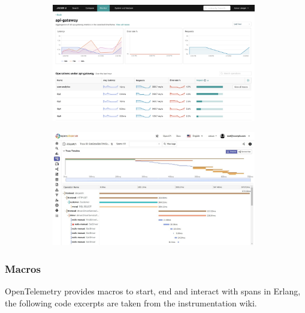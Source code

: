        \begin{figure}[H]
            \centering
            \begin{subfigure}{.5\textwidth}
                \centering
                \includegraphics[width=0.98\textwidth]{img/jaeger.png}
                \label{fig:sub1}
            \end{subfigure}%
            \begin{subfigure}{.5\textwidth}
                \centering
                \includegraphics[width =0.98\textwidth]{img/jaeger2.jpg}
                \label{fig:sub2}
            \end{subfigure}
            \label{fig:test}
            \end{figure}


    \subsubsection{Macros}
        OpenTelemetry provides macros to start, end and interact with spans in Erlang, the following code excerpts are taken from the instrumentation wiki. \cite{otel-in}
